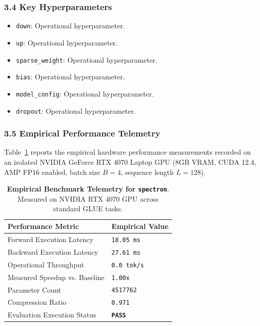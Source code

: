 \subsubsection*{3.4 Key Hyperparameters}
\begin{itemize}
    \item \texttt{down}: Operational hyperparameter.
    \item \texttt{up}: Operational hyperparameter.
    \item \texttt{sparse\_weight}: Operational hyperparameter.
    \item \texttt{bias}: Operational hyperparameter.
    \item \texttt{model\_config}: Operational hyperparameter.
    \item \texttt{dropout}: Operational hyperparameter.
\end{itemize}

\subsubsection*{3.5 Empirical Performance Telemetry}
Table~\ref{tab:telemetry_spectron} reports the empirical hardware performance measurements recorded on an isolated NVIDIA GeForce RTX 4070 Laptop GPU (8GB VRAM, CUDA 12.4, AMP FP16 enabled, batch size $B=4$, sequence length $L=128$).

\begin{table}[h]
\centering
\small
\caption{\textbf{Empirical Benchmark Telemetry for \texttt{spectron}}. Measured on NVIDIA RTX 4070 GPU across standard GLUE tasks.}
\label{tab:telemetry_spectron}
\begin{tabularx}{\columnwidth}{lX}
\toprule
\textbf{Performance Metric} & \textbf{Empirical Value} \\
\midrule
Forward Execution Latency & \texttt{18.05 ms} \\
Backward Execution Latency & \texttt{27.61 ms} \\
Operational Throughput & \texttt{0.0 tok/s} \\
Measured Speedup vs. Baseline & \texttt{1.00x} \\
Parameter Count & \texttt{4517762} \\
Compression Ratio & \texttt{0.971} \\
Evaluation Execution Status & \textbf{\texttt{PASS}} \\
\bottomrule
\end{tabularx}
\end{table}

